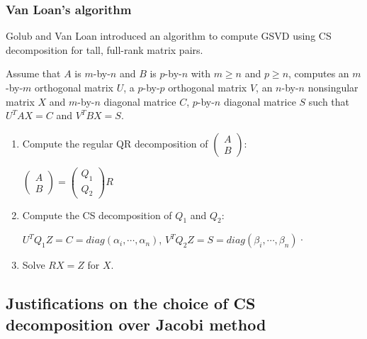     \subsubsection{Van Loan's algorithm}
    Golub and Van Loan \cite[pp.~502--503]{golub2013matrix} introduced an algorithm to compute GSVD using CS decomposition for tall, full-rank matrix pairs. 
    
    Assume that $A$ is $m$-by-$n$ and $B$ is $p$-by-$n$ with $m \geq n$ and $p \geq n$, computes an $m$-by-$m$ orthogonal matrix $U$, a $p$-by-$p$ orthogonal matrix $V$, an $n$-by-$n$ nonsingular matrix $X$ and $m$-by-$n$ diagonal matrice $C$, $p$-by-$n$ diagonal matrice $S$ such that $U^{T}AX = C$ and $V^{T}BX = S$. 
    
    \begin{enumerate}
        \item Compute the regular QR decomposition of $\begin{pmatrix} A\\ B\end{pmatrix}$:
    
        $\begin{pmatrix}
        A \\ 
        B 
       \end{pmatrix}  = \begin{pmatrix}
        Q_1 \\ 
        Q_2
       \end{pmatrix}R$
       
       \item Compute the CS decomposition of $Q_1$ and $Q_2$:
       
        $U^{T}Q_1Z = C = diag(\alpha_i, \cdots, \alpha_n)$,
        $V^{T}Q_2Z = S = diag(\beta_i, \cdots, \beta_n)$· 
        
        \item Solve $RX = Z$ for $X$.
    \end{enumerate}
    
\subsection{Justifications on the choice of CS decomposition 
over Jacobi method}

